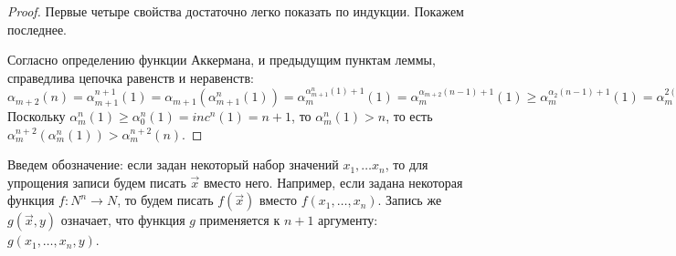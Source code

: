 \begin{proof}
Первые четыре свойства достаточно легко показать по индукции. Покажем последнее.

Согласно определению функции Аккермана, и предыдущим пунктам леммы,
справедлива цепочка равенств и неравенств: 
$\alpha_{m+2}(n) = \alpha_{m+1}^{n+1}(1) = \alpha_{m+1}(\alpha_{m+1}^n(1)) =
\alpha_m^{\alpha_{m+1}^n(1)+1}(1) = \alpha_m^{\alpha_{m+2}(n-1)+1}(1)
\ge \alpha_m^{\alpha_2(n-1)+1}(1) = \alpha_m^{2(n-1)+3+1}(1) =
 \alpha_m^{n+n+2}(1) = \alpha_m^{n+2} (\alpha_m^{n}(1))$
%
Поскольку $\alpha_m^{n}(1) \ge \alpha_0^{n}(1) = inc^n(1) = n+1$, то
$\alpha_m^{n}(1) > n$, то есть $\alpha_m^{n+2} (\alpha_m^{n}(1)) > \alpha^{n+2}_m(n)$.

%


%


\end{proof}


Введем обозначение: если задан некоторый набор значений
$x_1, \dots x_n$, то для упрощения записи будем писать $\overrightarrow{x}$
вместо него. Например, если задана некоторая функция $f: N^n \rightarrow N$,
то будем писать $f(\overrightarrow{x})$ вместо $f(x_1,\dots,x_n)$.
Запись же $g(\overrightarrow{x},y)$ означает, что функция $g$ применяется к
$n+1$ аргументу: $g(x_1, \dots, x_n, y)$.


